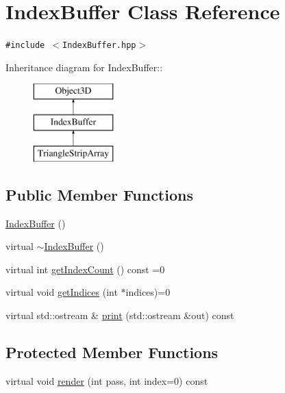\hypertarget{classm3g_1_1IndexBuffer}{
\section{IndexBuffer Class Reference}
\label{classm3g_1_1IndexBuffer}
}
{\tt \#include $<$IndexBuffer.hpp$>$}

Inheritance diagram for IndexBuffer::\begin{figure}[H]
\begin{center}
\leavevmode
\includegraphics[height=3cm]{classm3g_1_1IndexBuffer}
\end{center}
\end{figure}
\subsection*{Public Member Functions}
\begin{CompactItemize}
\item 
\hyperlink{classm3g_1_1IndexBuffer_d2e68a2d7c6c753d3abfeef42ee79427}{IndexBuffer} ()
\item 
virtual \hyperlink{classm3g_1_1IndexBuffer_ac7952364fe4d2d7b2731da5380c841c}{$\sim$IndexBuffer} ()
\item 
virtual int \hyperlink{classm3g_1_1IndexBuffer_ac7d2c37f177b21195a81f00061ef94e}{getIndexCount} () const =0
\item 
virtual void \hyperlink{classm3g_1_1IndexBuffer_59fb1eca8810ea3b028735c5dce53fca}{getIndices} (int $\ast$indices)=0
\item 
virtual std::ostream \& \hyperlink{classm3g_1_1IndexBuffer_6fea17fa1532df3794f8cb39cb4f911f}{print} (std::ostream \&out) const 
\end{CompactItemize}
\subsection*{Protected Member Functions}
\begin{CompactItemize}
\item 
virtual void \hyperlink{classm3g_1_1IndexBuffer_1efcb1973989d9963d5bd6d03065d389}{render} (int pass, int index=0) const 
\end{CompactItemize}
